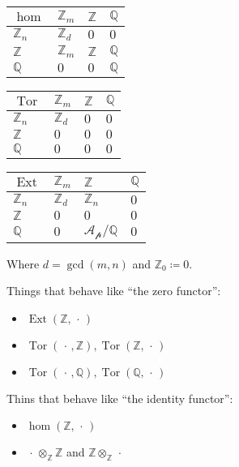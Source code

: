 \begin{longtable}[]{@{}llll@{}}
\toprule
\(\hom\) & \({\mathbb{Z}}_m\) & \({\mathbb{Z}}\) &
\({\mathbb{Q}}\)\tabularnewline
\midrule
\endhead
\({\mathbb{Z}}_n\) & \({\mathbb{Z}}_d\) & \(0\) & \(0\)\tabularnewline
\({\mathbb{Z}}\) & \({\mathbb{Z}}_m\) & \({\mathbb{Z}}\) &
\({\mathbb{Q}}\)\tabularnewline
\({\mathbb{Q}}\) & \(0\) & \(0\) & \({\mathbb{Q}}\)\tabularnewline
\bottomrule
\end{longtable}

\begin{longtable}[]{@{}llll@{}}
\toprule
\(\operatorname{Tor}\) & \({\mathbb{Z}}_m\) & \({\mathbb{Z}}\) &
\({\mathbb{Q}}\)\tabularnewline
\midrule
\endhead
\({\mathbb{Z}}_n\) & \({\mathbb{Z}}_d\) & \(0\) & \(0\)\tabularnewline
\({\mathbb{Z}}\) & \(0\) & \(0\) & \(0\)\tabularnewline
\({\mathbb{Q}}\) & \(0\) & \(0\) & \(0\)\tabularnewline
\bottomrule
\end{longtable}

\begin{longtable}[]{@{}llll@{}}
\toprule
\(\operatorname{Ext}\) & \({\mathbb{Z}}_m\) & \({\mathbb{Z}}\) &
\({\mathbb{Q}}\)\tabularnewline
\midrule
\endhead
\({\mathbb{Z}}_n\) & \({\mathbb{Z}}_d\) & \({\mathbb{Z}}_n\) &
\(0\)\tabularnewline
\({\mathbb{Z}}\) & \(0\) & \(0\) & \(0\)\tabularnewline
\({\mathbb{Q}}\) & \(0\) & \(\mathcal{A_p}/{\mathbb{Q}}\) &
\(0\)\tabularnewline
\bottomrule
\end{longtable}

Where \(d = \gcd(m, n)\) and \({\mathbb{Z}}_0 \coloneqq 0\).

Things that behave like ``the zero functor'':

\begin{itemize}
\tightlist
\item
  \(\operatorname{Ext} ({\mathbb{Z}}, {\,\cdot\,})\)
\item
  \(\operatorname{Tor}({\,\cdot\,}, {\mathbb{Z}}), \operatorname{Tor}({\mathbb{Z}}, {\,\cdot\,})\)
\item
  \(\operatorname{Tor}({\,\cdot\,}, {\mathbb{Q}}), \operatorname{Tor}({\mathbb{Q}}, {\,\cdot\,})\)
\end{itemize}

Thins that behave like ``the identity functor'':

\begin{itemize}
\tightlist
\item
  \(\hom({\mathbb{Z}}, {\,\cdot\,})\)
\item
  \({\,\cdot\,}\otimes_{\mathbb{Z}}{\mathbb{Z}}\) and
  \({\mathbb{Z}}\otimes_{\mathbb{Z}}{\,\cdot\,}\)
\end{itemize}

